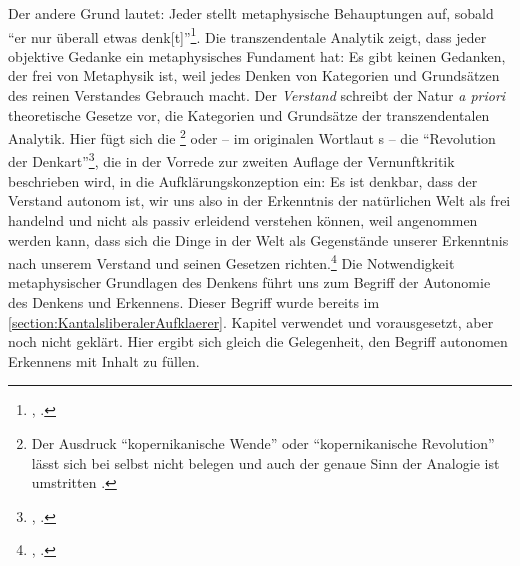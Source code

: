 \begin{nummerierung}
\item\label{subsubsection:MetaphysikalsGrundlageunseresDenkens}
Der andere Grund lautet: Jeder stellt metaphysische Behauptungen auf, sobald
\enquote{er nur überall etwas
denk[t]}\footnote{\cite[][A x]{Kant:KritikderreinenVernunft2003}, \cite[][IV:
8.33]{Kant:GesammelteWerke1900ff.}.}. Die transzendentale Analytik zeigt, dass
jeder objektive Gedanke ein metaphysisches Fundament hat: Es gibt keinen
Gedanken, der frei von Metaphysik ist, weil jedes Denken von Kategorien und
Grundsätzen des reinen Verstandes Gebrauch macht. Der \textit{Verstand} schreibt
der Natur \emph{a priori} theoretische Gesetze vor, die Kategorien und Grundsätze der
transzendentalen Analytik. Hier fügt sich die \footnote{Der Ausdruck \enquote{kopernikanische Wende} oder
\enquote{kopernikanische Revolution} lässt sich bei 
selbst nicht belegen und auch der genaue Sinn der Analogie ist umstritten
\parencite[siehe
dazu][]{Schoenecker:Kantskopernikanisch-newtonischeAnalogie2011}.} oder -- im
originalen Wortlaut s -- die \enquote{Revolution der
Denkart}\footnote{\cite[][B xi]{Kant:KritikderreinenVernunft2003}, \cite[][III:
9.19]{Kant:GesammelteWerke1900ff.}.}, die in der Vorrede zur zweiten Auflage der
Vernunftkritik beschrieben wird, in die Aufklärungskonzeption ein:
Es ist denkbar, dass der Verstand autonom ist, wir uns also in der Erkenntnis
der natürlichen Welt als frei handelnd und nicht als passiv erleidend verstehen
können, weil angenommen werden kann, dass sich die Dinge in der
Welt als Gegenstände unserer Erkenntnis nach unserem Verstand und seinen
Gesetzen richten.\footnote{\cite[Vgl.][B
xvi--xviii]{Kant:KritikderreinenVernunft2003}, \cite[][III:
12.3--33]{Kant:GesammelteWerke1900ff.}.} Die Notwendigkeit metaphysischer
Grundlagen des Denkens führt uns zum Begriff der Autonomie des Denkens und
Erkennens. Dieser Begriff wurde bereits im
\ref{section:KantalsliberalerAufklaerer}. Kapitel verwendet und vorausgesetzt,
aber noch nicht geklärt. Hier ergibt sich gleich die Gelegenheit, den Begriff autonomen
Erkennens mit Inhalt zu füllen.
\end{nummerierung}

